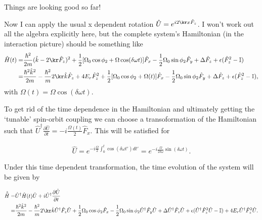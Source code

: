 Things are looking good so far!

Now I can apply the usual x dependent rotation $\hat{U} = e^{i2\kr x \hat{F}_z}$. I won't work out all the algebra explicitly here, but the complete system's Hamiltonian (in the interaction picture) should be something like
%
%
\begin{align}
\begin{split}
\hat{H}(t) = & \frac{\hbar^2}{2m}(\hat{k}-2\kr\hat{F}_z)^2 + \frac{1}{2}[\Omega_0\cos\phi_2 + \Omega\cos(\delta\omega t)]\hat{F}_x - \frac{1}{2}\Omega_0\sin\phi_2\hat{F}_y +\Delta\hat{F}_z + \epsilon(\hat{F}_z^2-\mathbb{I}) \\
= &\frac{\hbar^2\hat{k}^2}{2m} - \frac{\hbar^2}{m}2\kr \hat{k}\hat{F}_z +4E_r\hat{F}_z^2 + \frac{1}{2}[\Omega_0\cos\phi_2 + \Omega(t)]\hat{F}_x - \frac{1}{2}\Omega_0\sin\phi_2\hat{F}_y + \Delta\hat{F}_z +
\epsilon(\hat{F}_z^2-\mathbb{I}) ,
\end{split}
\end{align}
%
%
with $\Omega(t)=\Omega\cos(\delta\omega t)$.

To get rid of the time dependence in the Hamiltonian and ultimately getting the `tunable' spin-orbit coupling we can choose a transoformation of the Hamiltonian such that $\hat{U}^{\dagger} \frac{\partial\hat{U}}{\partial t} = -i \frac{\Omega(t)}{2}\hat{F}_x$. This will be satisfied for

\begin{align}
\hat{U} = e^{-i\frac{\Omega}{2}\int_0^t\cos(\delta\omega t')dt'} = e^{-i\frac{\Omega}{2\delta\omega}\sin(\delta\omega t)}.
\end{align}

Under this time dependent transformation, the time evolution of the system will be given by
%

\begin{align}
\begin{split}
\hat{\tilde{H}} = & \hat{U}^{\dagger}\hat{H}(t)\hat{U} + i\hat{U}^{\dagger} \frac{\partial\hat{U}}{\partial t} \\
=  &\frac{\hbar^2\hat{k}^2}{2m} - \frac{\hbar^2}{m}2\kr\hat{k}\hat{U}^{\dagger}\hat{F}_z\hat{U} + \frac{1}{2}\Omega_0\cos\phi_2\hat{F}_x - \frac{1}{2}\Omega_0\sin\phi_2\hat{U}^{\dagger}\hat{F}_y\hat{U} + \Delta\hat{U}^{\dagger}\hat{F}_z\hat{U} + \epsilon(\hat{U}^{\dagger}\hat{F}_z^2\hat{U}-\mathbb{I})+4E_r \hat{U}^{\dagger}\hat{F}_z^2\hat{U}.
\end{split}
\end{align}

